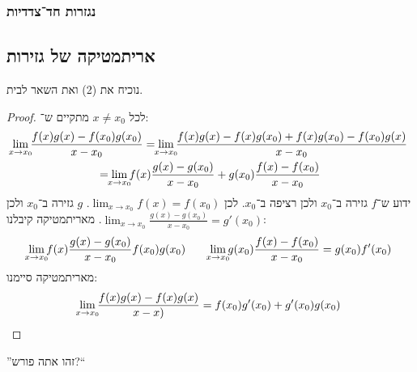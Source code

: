 \documentclass[name=רשימות חשבון דיפרנציאלי ואינטגרלי 1א]{../../../tex/classes/megasumPreamble}
\newcommand\tfl     {\lim_{\mathclap{x \to x_0}}}
\begin{document}
	\subsubsection{נגזרות חד־צדדיות}


	\subsection{אריתמטיקה של גזירות}
	נוכיח את (2) ואת השאר לבית.
	\begin{proof}
		לכל $x \neq x_0$ מתקיים ש־:
		\begin{multline*}
			\tfl \frac{f(x)g(x) - f(x_0)g(x_0)}{x - x_0} = \tfl \frac{f(x) g(x) - f(x)g(x_0) + f(x)g(x_0) - f(x_0)g(x)}{x - x_0} \\
			= \tfl f(x) \frac{g(x) - g(x_0)}{x - x_0} + g(x_0) \frac{f(x) - f(x_0)}{x - x_0}
		\end{multline*}
		ידוע ש־$f$ גזירה ב־$x_0$ ולכן רציפה ב־$x_0$. לכן $\lim_{x \to x_0} f(x) = f(x_0)$. $g$ גזירה ב־$x_0$ ולכן $\lim_{x \to x_0} \frac{g(x) - g(x_0)}{x - x_0} = g'(x_0)$. מאריתמטיקה קיבלנו:
		\[ \tfl f(x) \frac{g(x) - g(x_0)}{x - x_0} f(x_0)g(x_0) \quad\quad \tfl g(x_0) \frac{f(x) - f(x_0)}{x - x_0} = g(x_0)f'(x_0) \]
		מאריתמטיקה סיימנו:
		\[ \tfl \frac{f(x)g(x) - f(x)g(x)}{x - x)} = f(x_0)g'(x_0) + g'(x_0)g(x_0) \]

	\end{proof}
	''זהו אתה פורש?``
\end{document}
